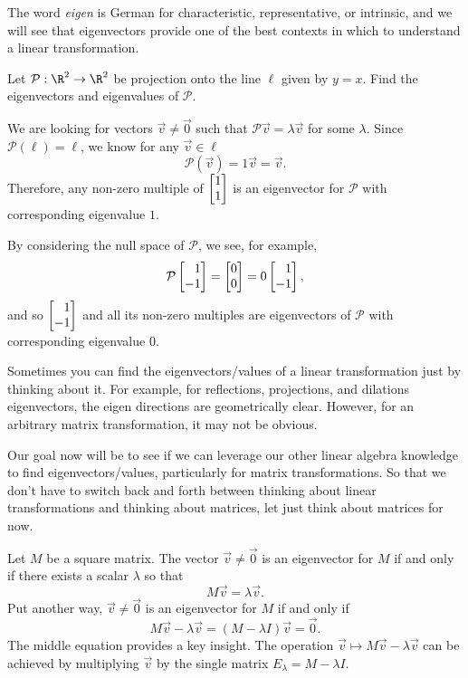 
The word \emph{eigen} is German for characteristic, representative, or intrinsic, and
we will see that eigenvectors provide one of the best contexts in which to understand a linear transformation.

\begin{example}
	Let $\mathcal P:\R^2\to\R^2$ be projection onto the line $\ell$ given by $y=x$.
	Find the eigenvectors and eigenvalues of $\mathcal P$.

	We are looking for vectors $\vec v\neq \vec 0$ such that $\mathcal P\vec v=\lambda \vec v$ for some $\lambda$.
	Since $\mathcal P(\ell)=\ell$, we know for any $\vec v\in \ell$
	\[
		\mathcal P(\vec v)=1\vec v=\vec v.
	\]
	Therefore, any non-zero multiple of $\mat{1\\1}$ is an eigenvector for $\mathcal P$ with corresponding
	eigenvalue $1$.

	By considering the null space of $\mathcal P$, we see, for example,
	\[
		\mathcal P\mat{1\\-1}=\mat{0\\0}=0\mat{1\\-1},
	\]
	and so $\mat{1\\-1}$ and all its non-zero multiples are eigenvectors of $\mathcal P$ with corresponding
	eigenvalue $0$.
\end{example}


Sometimes you can find the eigenvectors/values of a linear transformation just by thinking about it.
For example, for reflections, projections, and dilations eigenvectors, the eigen directions
are geometrically clear. However, for an arbitrary matrix transformation, it may not be obvious.

Our goal now will be to see if we can leverage our other linear algebra knowledge to find eigenvectors/values,
particularly for matrix transformations. So that we don't have to switch back and forth
between thinking about linear transformations and thinking about matrices, let just think about matrices for now.

Let $M$ be a square matrix. The vector $\vec v\neq \vec 0$
is an eigenvector for $M$ if and only if there exists a scalar $\lambda$ so that
\begin{equation}
	\label{EQEIGEN}
	M\vec v=\lambda \vec v.
\end{equation}
Put another way, $\vec v\neq \vec 0$ is an eigenvector for $M$ if and only if
\[
	M\vec v-\lambda \vec v=(M-\lambda I)\vec v=\vec 0.
\]
The middle equation provides a key insight. The operation $\vec v\mapsto M\vec v-\lambda\vec v$ can be achieved
by multiplying $\vec v$ by the single matrix $E_\lambda=M-\lambda I$.

